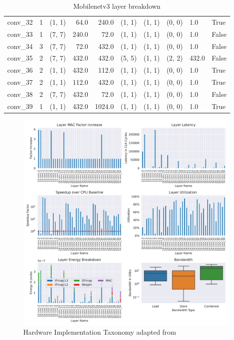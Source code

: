 \begin{center}
\begin{table}[]
\begin{tabular}{lrlrrlllll}
        conv\_32 &      1 &      (1, 1) &   64.0 &   240.0 &  (1, 1) &  (1, 1) &  (0, 0) &    1.0 &   True \\
        conv\_33 &      1 &      (7, 7) &  240.0 &    72.0 &  (1, 1) &  (1, 1) &  (0, 0) &    1.0 &  False \\
        conv\_34 &      3 &      (7, 7) &   72.0 &   432.0 &  (1, 1) &  (1, 1) &  (0, 0) &    1.0 &  False \\
        conv\_35 &      2 &      (7, 7) &  432.0 &   432.0 &  (5, 5) &  (1, 1) &  (2, 2) &  432.0 &  False \\
        conv\_36 &      2 &      (1, 1) &  432.0 &   112.0 &  (1, 1) &  (1, 1) &  (0, 0) &    1.0 &   True \\
        conv\_37 &      2 &      (1, 1) &  112.0 &   432.0 &  (1, 1) &  (1, 1) &  (0, 0) &    1.0 &   True \\
        conv\_38 &      2 &      (7, 7) &  432.0 &    72.0 &  (1, 1) &  (1, 1) &  (0, 0) &    1.0 &  False \\
        conv\_39 &      1 &      (1, 1) &  432.0 &  1024.0 &  (1, 1) &  (1, 1) &  (0, 0) &    1.0 &   True \\
        \bottomrule
        \end{tabular}
        \caption{Mobilenetv3 layer breakdown}
        \label{tab:mobilenetv3_layer_breakdown}
    \end{table}
\end{center}


\begin{figure}[ht]
    \centering
    \includegraphics[scale=0.6]{Plots/networks/mobilenetv3_small_075.pdf}
    \caption{Hardware Implementation Taxonomy adapted from \cite{maestro}}
    \label{fig:mobilenetv3_metrics}
\end{figure}



